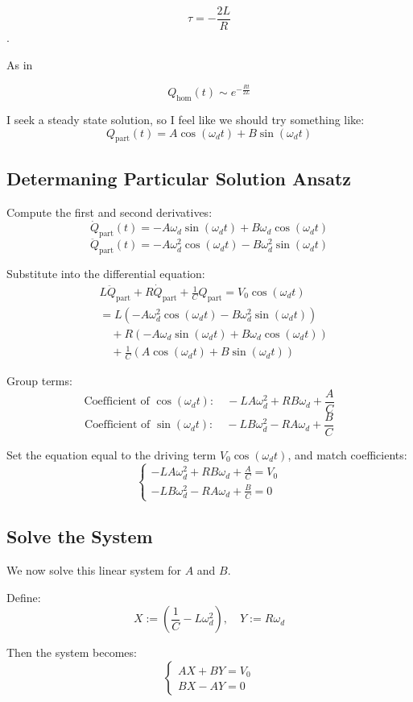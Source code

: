 \documentclass{article}
\begin{document}
\[\tau = -\frac{2L}{R}\].

As in 

\[Q_{\text{hom}}(t) \sim e^{-\frac{Rt}{2L}}\]

I seek a steady state solution, so I feel like we should try something like:
\[
Q_{\text{part}}(t) = A \cos(\omega_d t) + B \sin(\omega_d t)
\]

\subsection{Determaning Particular Solution Ansatz}
Compute the first and second derivatives:
\[
\dot{Q}_{\text{part}}(t) = -A \omega_d \sin(\omega_d t) + B \omega_d \cos(\omega_d t)
\]
\[
\ddot{Q}_{\text{part}}(t) = -A \omega_d^2 \cos(\omega_d t) - B \omega_d^2 \sin(\omega_d t)
\]

Substitute into the differential equation:
\begin{align*}
&L \ddot{Q}_{\text{part}} + R \dot{Q}_{\text{part}} + \frac{1}{C} Q_{\text{part}} = V_0 \cos(\omega_d t) \\
&= L(-A \omega_d^2 \cos(\omega_d t) - B \omega_d^2 \sin(\omega_d t)) \\
&\quad + R(-A \omega_d \sin(\omega_d t) + B \omega_d \cos(\omega_d t)) \\
&\quad + \frac{1}{C}(A \cos(\omega_d t) + B \sin(\omega_d t))
\end{align*}

Group terms:
\[
\text{Coefficient of } \cos(\omega_d t):\quad -L A \omega_d^2 + R B \omega_d + \frac{A}{C}
\]
\[
\text{Coefficient of } \sin(\omega_d t):\quad -L B \omega_d^2 - R A \omega_d + \frac{B}{C}
\]

Set the equation equal to the driving term \( V_0 \cos(\omega_d t) \), and match coefficients:
\[
\begin{cases}
- L A \omega_d^2 + R B \omega_d + \frac{A}{C} = V_0 \\
- L B \omega_d^2 - R A \omega_d + \frac{B}{C} = 0
\end{cases}
\]

\subsection*{Solve the System}

We now solve this linear system for \( A \) and \( B \).

Define:
\[
X := \left( \frac{1}{C} - L \omega_d^2 \right), \quad Y := R \omega_d
\]

Then the system becomes:
\[
\begin{cases}
A X + B Y = V_0 \\
B X - A Y = 0
\end{cases}
\]
\end{document}
